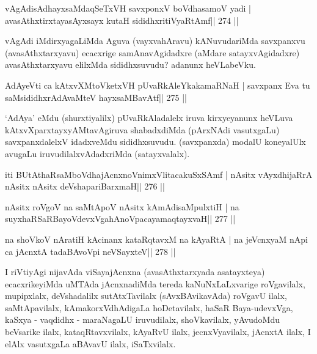 \begin{shl}
vAgAdisAdhayxsaMdaqSeTxVH \footnotemark[1]savxponxV \footnotemark[2]boVdhasamoV yadi |
avasAthxtirxtayasAyxsayx kutaH sididhxritiVyaRtAmf\hfill || 274 ||
\end{shl}

\begin{artha}
vAgAdi iMdirxyagaLiMda Aguva (vayxvahAravu) kANuvudariMda savxpanxvu (ava\-sAthxtarxyavu) ecacxrige samAnavAgidadxre (aMdare satayxvAgidadxre) avasAthxtarxyavu \-elilxMda sididhxsuvudu? adanunx heVLabeVku.
\end{artha}

\begin{shl}
AdAyeVti ca kAtxvXMtoVketxVH pUvaRkAleYkakamaRNaH |
savxpanx Eva tu saMsididhxrAdAvaMteV hayxsaMBavAtf\hfill || 275 ||
\end{shl}

\begin{artha}
`AdAya' eMdu (shurxtiyalilx) pUvaRkAladalelx iruva kirxyeyanunx heVLuva kAtxvXparxtayxyAMtavAgiruva shabadxdiMda (pArxNAdi vasutxgaLu) savxpanxdalelxV idadxveMdu sididhxsuvudu. (savxpanxda) modalU koneyalUlx avugaLu iruvudilalxvAdadxriMda (satayxvalalx).
\end{artha}


\begin{shl}
iti BUtAthaRsaMboVdhajAcnxnoVnimxVlitacakuSxSAmf |
nAsitx vAyxdhijaRrA nAsitx nAsitx deVshapariBarxmaH\hfill || 276 ||
\end{shl}

\begin{shl}
nAsitx roVgoV na saMtApoV nAsitx kAmAdisaMpulxtiH |
na suyxhaRSaRBayoVdevxVgahAnoVpacayamaqtayxvaH\hfill || 277 ||
\end{shl}

\begin{shl}
na shoVkoV nAratiH kAcinanx kataRqtavxM na kAyaRtA |
na jeVcnxyaM nApi ca jAcnxtA tadaBAvoV\s pi neVSayxteV\hfill || 278 ||
\end{shl}

\begin{artha}
I riVtiyAgi nijavAda viSayajAcnxna (avasAthxtarxyada asatayxteya) 
ecacxrikeyiMda uMTAda jAcnxnadiMda tereda kaNuNxLaLxvarige roVgavilalx, mupipxlalx, deVshadalilx sutAtxTavilalx (sAvxBAvikavAda) roVgavU ilalx, saMtApavilalx, kAmakorxVdhAdigaLa hoDetavilalx, haSaR Baya-udevxVga, kaSxya - vaqdidhx - maraNagaLU iruvu\-dilalx, shoVkavilalx, yAvudoMdu beVsarike ilalx, kataqRtavxvilalx, kAyaRvU ilalx, \-jecnxVyavilalx, jAcnxtA ilalx, I elAlx vasutxgaLa aBAvavU ilalx, iSaTxvilalx.
\end{artha}

